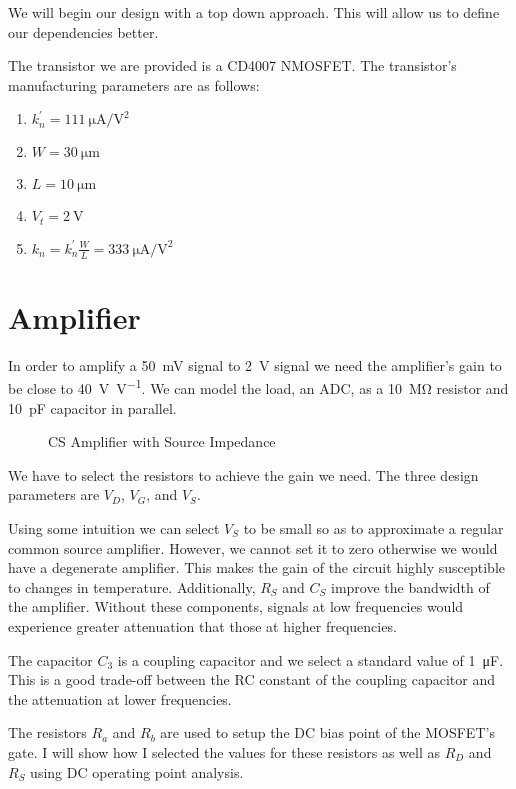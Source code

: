 \documentclass[journal]{IEEEtran}
\begin{document}
We will begin our design with a top down approach. This will allow us to define our dependencies better.

The transistor we are provided is a CD4007 NMOSFET. The transistor's manufacturing parameters are as follows:

\begin{enumerate}
	\item $k_n^{'}=\SI{111}{\micro\ampere\per\volt\squared}$
	\item $W=\SI{30}{\micro\meter}$
	\item $L=\SI{10}{\micro\meter}$
	\item $V_t=\SI{2}{\volt}$
	\item $k_n = k_n^{'} \frac{W}{L} = \SI{333}{\micro\ampere\per\volt\squared}$
\end{enumerate}

\section{Amplifier}
In order to amplify a \SI{50}{\milli\volt} signal to \SI{2}{\volt} signal we need the amplifier's gain to be close to \SI[per-mode=symbol]{40}{\volt\per\volt}. We can model the load, an ADC, as a \SI{10}{\mega\ohm} resistor and \SI{10}{\pico\farad} capacitor in parallel.

\begin{figure}[H]
	\centering
	
	\caption{CS Amplifier with Source Impedance\cite{roberts_2017_amps}}
	\label{amp}
\end{figure}

We have to select the resistors to achieve the gain we need. The three design parameters are $V_D$, $V_G$, and $V_S$. 

Using some intuition we can select $V_S$ to be small so as to approximate a regular common source amplifier. However, we cannot set it to zero otherwise we would have a degenerate amplifier. This makes the gain of the circuit highly susceptible to changes in temperature. Additionally, $R_S$ and $C_S$ improve the bandwidth of the amplifier. Without these components, signals at low frequencies would experience greater attenuation that those at higher frequencies.

The capacitor $C_3$ is a coupling capacitor and we select a standard value of \SI{1}{\micro\farad}. This is a good trade-off between the RC constant of the coupling capacitor and the attenuation at lower frequencies.

The resistors $R_a$ and $R_b$ are used to setup the DC bias point of the MOSFET's gate. I will show how I selected the values for these resistors as well as $R_D$ and $R_S$ using DC operating point analysis.
\end{document}

